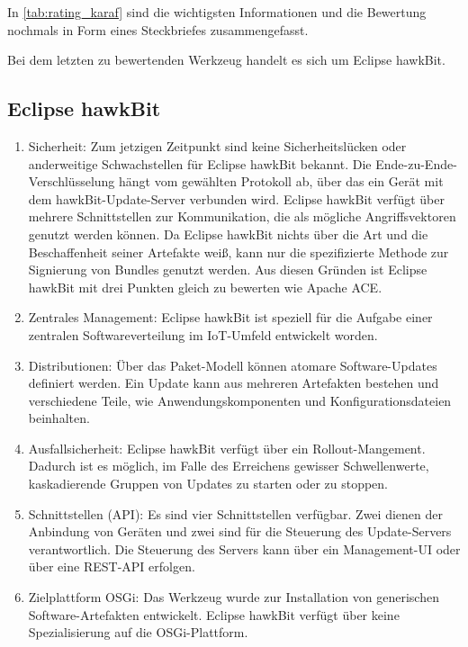 In \autoref{tab:rating_karaf} sind die wichtigsten Informationen und die Bewertung nochmals in Form eines Steckbriefes zusammengefasst.


Bei dem letzten zu bewertenden Werkzeug handelt es sich um Eclipse hawkBit. 

\subsection{Eclipse hawkBit}
\begin{enumerate}[label={Nr. \arabic*}, leftmargin=*, labelindent=1em]
 \item Sicherheit:
 Zum jetzigen Zeitpunkt sind keine Sicherheitslücken oder anderweitige Schwachstellen für Eclipse hawkBit bekannt.
 Die Ende-zu-Ende-Verschlüsselung hängt vom gewählten Protokoll ab, über das ein Gerät mit dem hawkBit-Update-Server verbunden wird.
 Eclipse hawkBit verfügt über mehrere Schnittstellen zur Kommunikation, die als mögliche Angriffsvektoren genutzt werden können. 
 Da Eclipse hawkBit nichts über die Art und die Beschaffenheit seiner Artefakte weiß, kann nur die spezifizierte Methode zur Signierung von Bundles genutzt werden.
 Aus diesen Gründen ist Eclipse hawkBit mit drei Punkten gleich zu bewerten wie Apache ACE.
 
 \item Zentrales Management: 
 Eclipse hawkBit ist speziell für die Aufgabe einer zentralen Softwareverteilung im \ac{IoT}-Umfeld entwickelt worden.

 \item Distributionen:
 Über das Paket-Modell können atomare Software-Updates definiert werden. Ein Update kann aus mehreren Artefakten bestehen und verschiedene Teile, 
 wie Anwendungskomponenten und Konfigurationsdateien beinhalten.

 \item Ausfallsicherheit:
 Eclipse hawkBit verfügt über ein Rollout-Mangement.
 Dadurch ist es möglich, im Falle des Erreichens gewisser Schwellenwerte, kaskadierende Gruppen von Updates zu starten oder zu stoppen.
 
 \item Schnittstellen (\ac{API}):
 Es sind vier Schnittstellen verfügbar. Zwei dienen der Anbindung von Geräten und zwei sind für die Steuerung des Update-Servers verantwortlich. 
 Die Steuerung des Servers kann über ein Management-UI oder über eine \ac{REST}-\ac{API} erfolgen.

 \item Zielplattform \ac{OSGi}: Das Werkzeug wurde zur Installation von generischen Software-Artefakten entwickelt.
 Eclipse hawkBit verfügt über keine Spezialisierung auf die \ac{OSGi}-Plattform. 
 

\end{enumerate}
